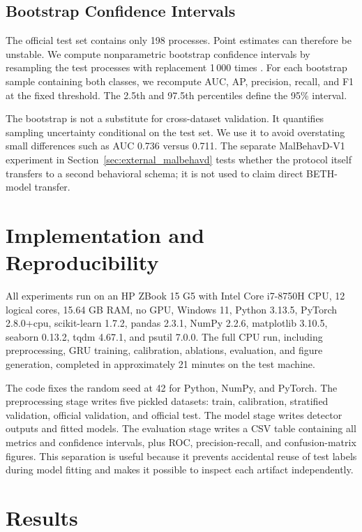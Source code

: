 \documentclass[journal]{IEEEtran}
\begin{document}
\subsection{Bootstrap Confidence Intervals}

The official test set contains only 198 processes. Point estimates can therefore be unstable. We compute nonparametric bootstrap confidence intervals by resampling the test processes with replacement 1\,000 times \cite{efron1994}. For each bootstrap sample containing both classes, we recompute AUC, AP, precision, recall, and F1 at the fixed threshold. The 2.5th and 97.5th percentiles define the 95\% interval.

The bootstrap is not a substitute for cross-dataset validation. It quantifies sampling uncertainty conditional on the test set. We use it to avoid overstating small differences such as AUC 0.736 versus 0.711. The separate MalBehavD-V1 experiment in Section~\ref{sec:external_malbehavd} tests whether the protocol itself transfers to a second behavioral schema; it is not used to claim direct BETH-model transfer.

\section{Implementation and Reproducibility}
\label{sec:implementation}

All experiments run on an HP ZBook 15 G5 with Intel Core i7-8750H CPU, 12 logical cores, 15.64 GB RAM, no GPU, Windows 11, Python 3.13.5, PyTorch 2.8.0+cpu, scikit-learn 1.7.2, pandas 2.3.1, NumPy 2.2.6, matplotlib 3.10.5, seaborn 0.13.2, tqdm 4.67.1, and psutil 7.0.0. The full CPU run, including preprocessing, GRU training, calibration, ablations, evaluation, and figure generation, completed in approximately 21 minutes on the test machine.

The code fixes the random seed at 42 for Python, NumPy, and PyTorch. The preprocessing stage writes five pickled datasets: train, calibration, stratified validation, official validation, and official test. The model stage writes detector outputs and fitted models. The evaluation stage writes a CSV table containing all metrics and confidence intervals, plus ROC, precision-recall, and confusion-matrix figures. This separation is useful because it prevents accidental reuse of test labels during model fitting and makes it possible to inspect each artifact independently.

\section{Results}
\label{sec:results}
\end{document}

